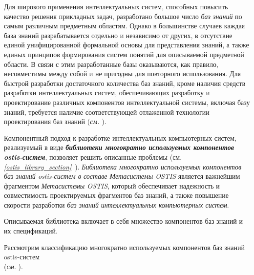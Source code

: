 Для широкого применения интеллектуальных систем, способных повысить качество решения
прикладных задач, разработано большое число \textit{баз знаний} по самым различным предметным областям. Однако в большинстве случаев каждая база знаний разрабатывается отдельно и независимо от других, в отсутствие единой унифицированной формальной основы для представления знаний, а также единых принципов формирования систем понятий для описываемой предметной области. В связи с этим разработанные базы оказываются, как правило, несовместимы между собой и не пригодны для повторного использования. Для быстрой разработки достаточного количества баз знаний, кроме наличия средств разработки интеллектуальных систем, обеспечивающих разработку и проектирование различных компонентов интеллектуальной системы, включая базу знаний, требуется наличие соответствующей отлаженной технологии проектирования баз знаний (\textit{см. }). 

Компонентный подход к разработке интеллектуальных компьютерных систем, реализуемый в виде \textbf{\textit{библиотеки многократно используемых компонентов ostis-систем}}, позволяет решить описанные проблемы (см. \textit{\ref{ostis_library_section}~}). \textit{Библиотека многократно используемых компонентов баз знаний ostis-систем в составе Метасистемы OSTIS} является важнейшим фрагментом \textit{Метасистемы OSTIS}, который обеспечивает надежность и совместимость проектируемых фрагментов баз знаний, а также повышение скорости разработки \textit{баз знаний} \textit{интеллектуальных компьютерных систем}.

Описываемая библиотека включает в себя множество компонентов баз знаний и их спецификаций.

Рассмотрим классификацию многократно используемых компонентов баз знаний ostis-систем\\ (\textit{см. }).


